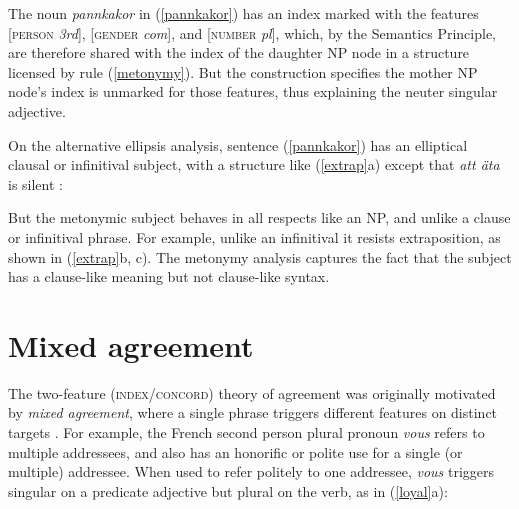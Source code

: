 \documentclass[output=paper
                ,modfonts
                ,nonflat
	        ,collection
	        ,collectionchapter
	        ,collectiontoclongg
 	        ,biblatex
                ,babelshorthands
                ,newtxmath
                ,draftmode
                ,colorlinks, citecolor=brown
]{./langsci/langscibook}
\begin{document}
{\noindent
The noun \emph{pannkakor} in (\ref{pannkakor}) has an index marked with the features [\textsc{person}  \textit{3rd}], [\textsc{gender} \textit{com}], and [\textsc{number} \textit{pl}], which, by the Semantics Principle, are therefore shared with the index of the daughter NP node in a structure licensed by rule (\ref{metonymy}).  But the construction  specifies the mother NP node's index is unmarked for those features, thus explaining the neuter singular adjective.    

On the alternative ellipsis analysis, sentence (\ref{pannkakor}) has an elliptical clausal or infinitival subject, with a structure like (\ref{extrap}a) except that \emph{att \"{a}ta} is silent \citep{Faarlund:1977, Enger:2004,Josefsson:2009}:  

\begin{exe} 
\ex\label{extrap}
\begin{xlist}
\end{xlist}
\end{exe}

\noindent
But the metonymic subject behaves in all respects like an NP, and unlike a clause or infinitival phrase.  For example, unlike an infinitival it resists extraposition, as shown in (\ref{extrap}b, c).  The metonymy analysis captures the fact that the subject has a clause-like meaning but not clause-like syntax.  
  


\section{Mixed agreement}
\label{mismatch}
 

The two-feature (\textsc{index/concord}) theory of agreement was originally motivated by
\textit{mixed agreement}, where a single phrase triggers different features on distinct targets
\parencites[Chapter~2]{Pollard+Sag:1994}{Kathol99b}.  For example, the French second person plural pronoun \textit{vous} refers to multiple addressees, and also has an honorific or polite use for a single (or multiple) addressee.  When used to refer politely to one addressee, \textit{vous} triggers singular on a predicate adjective but plural on the verb, as in (\ref{loyal}a):

}
\end{document}
